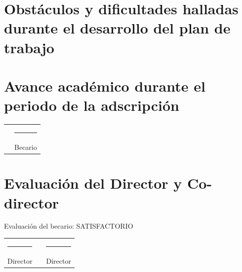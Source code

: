 \documentclass[11pt,a4paper]{article}
\begin{document}
\section{Obstáculos y dificultades halladas durante el desarrollo del plan de trabajo}

\section{Avance académico durante el periodo de la adscripción}

\vspace{5em} %
\begin{tabular}{lc} 
 \hspace{8.45cm} & \rule{5cm}{1pt} \\
  & Becario
\end{tabular}

\vspace{2em}\noindent\hrulefill

\section*{Evaluación del Director y Co-director}

\noindent Evaluación del becario: SATISFACTORIO

\vspace{5em} %
\begin{tabular}{clc}
   \rule{5cm}{1pt} & \hspace{3cm} & \rule{5cm}{1pt} \\ 
   Director & & Director
\end{tabular}
\end{document}
